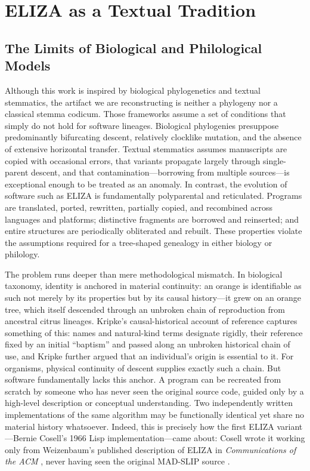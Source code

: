 \documentclass{article}
\begin{document}
\section{ELIZA as a Textual Tradition}

\subsection{The Limits of Biological and Philological Models}

Although this work is inspired by biological phylogenetics and textual stemmatics, the artifact we are reconstructing is neither a phylogeny nor a classical stemma codicum. Those frameworks assume a set of conditions that simply do not hold for software lineages. Biological phylogenies presuppose predominantly bifurcating descent, relatively clocklike mutation, and the absence of extensive horizontal transfer. Textual stemmatics assumes manuscripts are copied with occasional errors, that variants propagate largely through single-parent descent, and that contamination—borrowing from multiple sources—is exceptional enough to be treated as an anomaly. In contrast, the evolution of software such as ELIZA is fundamentally polyparental and reticulated. Programs are translated, ported, rewritten, partially copied, and recombined across languages and platforms; distinctive fragments are borrowed and reinserted; and entire structures are periodically obliterated and rebuilt. These properties violate the assumptions required for a tree-shaped genealogy in either biology or philology.

The problem runs deeper than mere methodological mismatch. In biological taxonomy, identity is anchored in material continuity: an orange is identifiable as such not merely by its properties but by its causal history—it grew on an orange tree, which itself descended through an unbroken chain of reproduction from ancestral citrus lineages. Kripke's causal-historical account of reference \cite{kripke1980naming} captures something of this: names and natural-kind terms designate rigidly, their reference fixed by an initial ``baptism'' and passed along an unbroken historical chain of use, and Kripke further argued that an individual's origin is essential to it. For organisms, physical continuity of descent supplies exactly such a chain. But software fundamentally lacks this anchor. A program can be recreated from scratch by someone who has never seen the original source code, guided only by a high-level description or conceptual understanding. Two independently written implementations of the same algorithm may be functionally identical yet share no material history whatsoever. Indeed, this is precisely how the first ELIZA variant—Bernie Cosell's 1966 Lisp implementation—came about: Cosell wrote it working only from Weizenbaum's published description of ELIZA in \textit{Communications of the ACM} \cite{weizenbaum1966eliza}, never having seen the original MAD-SLIP source \cite{cosell_personal_communication}.
\end{document}
